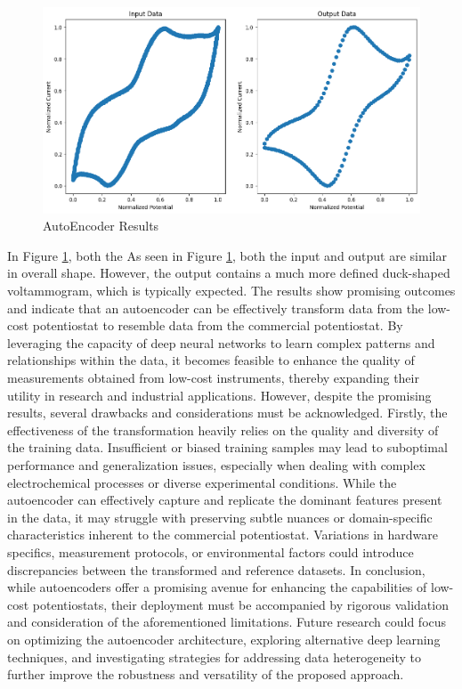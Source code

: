 \begin{figure}[h!]
  \centering
    \includegraphics[width=1\textwidth]{figures/autoencoder.png}
    \caption{AutoEncoder Results}
    \label{autoncoder_results}
\end{figure}
In Figure \ref{autoncoder_results}, both the
As seen in Figure \ref{autoncoder_results}, both the input and output are similar in overall shape. However, the output contains a much more defined duck-shaped voltammogram, which is typically expected. The results show promising outcomes and indicate that an autoencoder can be effectively transform data from the low-cost potentiostat to resemble data from the commercial potentiostat. By leveraging the capacity of deep neural networks to learn complex patterns and relationships within the data, it becomes feasible to enhance the quality of measurements obtained from low-cost instruments, thereby expanding their utility in research and industrial applications.
However, despite the promising results, several drawbacks and considerations must be acknowledged. Firstly, the effectiveness of the transformation heavily relies on the quality and diversity of the training data. Insufficient or biased training samples may lead to suboptimal performance and generalization issues, especially when dealing with complex electrochemical processes or diverse experimental conditions. While the autoencoder can effectively capture and replicate the dominant features present in the data, it may struggle with preserving subtle nuances or domain-specific characteristics inherent to the commercial potentiostat. Variations in hardware specifics, measurement protocols, or environmental factors could introduce discrepancies between the transformed and reference datasets. 
In conclusion, while autoencoders offer a promising avenue for enhancing the capabilities of low-cost potentiostats, their deployment must be accompanied by rigorous validation and consideration of the aforementioned limitations. Future research could focus on optimizing the autoencoder architecture, exploring alternative deep learning techniques, and investigating strategies for addressing data heterogeneity to further improve the robustness and versatility of the proposed approach.
